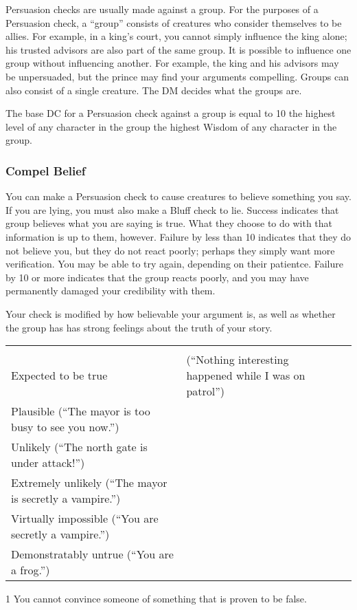 Persuasion checks are usually made against a group. For the purposes of a Persuasion check, a ``group'' consists of creatures who consider themselves to be allies. For example, in a king's court, you cannot simply influence the king alone; his trusted advisors are also part of the same group. It is possible to influence one group without influencing another. For example, the king and his advisors may be unpersuaded, but the prince may find your arguments compelling. Groups can also consist of a single creature. The DM decides what the groups are.

The base DC for a Persuasion check against a group is equal to 10 \add the highest level of any character in the group \add the highest Wisdom of any character in the group.

\subsubsection{Compel Belief}
You can make a Persuasion check to cause creatures to believe something you say. If you are lying, you must also make a Bluff check to lie. Success indicates that group believes what you are saying is true. What they choose to do with that information is up to them, however. Failure by less than 10 indicates that they do not believe you, but they do not react poorly; perhaps they simply want more verification. You may be able to try again, depending on their patientce. Failure by 10 or more indicates that the group reacts poorly, and you may have permanently damaged your credibility with them.

Your check is modified by how believable your argument is, as well as whether the group has has strong feelings about the truth of your story.

\begin{dtable}
  \begin{tabularx}{\columnwidth}{X l}
     &   \\
    Expected to be true & (``Nothing interesting happened while I was on patrol'') &  \\
    Plausible (``The mayor is too busy to see you now.'') &  \\
    Unlikely (``The north gate is under attack!'') &  \\
    Extremely unlikely (``The mayor is secretly a vampire.'') &  \\
    Virtually impossible (``You are secretly a vampire.'') &  \\
    Demonstratably untrue (``You are a frog.'') & \x{} \\
  \end{tabularx}
  1 You cannot convince someone of something that is proven to be false.
\end{dtable}

